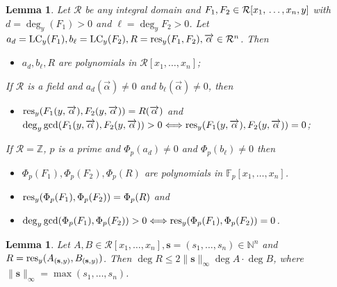 \documentclass[final,20pt]{elsarticle}
\newtheorem{lemma}[theorem]{Lemma}
\def\N{{\mathbb N}}
\def\Z{{\mathbb Z}}
\def\F{{\mathbb{F}}}
\def\res{\hbox{\rm{res}}}
\def\LC{\hbox{\rm{LC}}}
\begin{document}
\begin{lemma}\cite[Lemma 4]{hu2021fast}\label{lm-2}
Let $\mathcal{R}$ be any integral domain and $F_1,F_2\in\mathcal{R}[x_1,\\ \dots,x_n,y]$ with $d=\deg_y(F_1)>0$ and $\ell=\deg_yF_2>0$. Let $a_d=\LC_y(F_1),b_{\ell}=\LC_y(F_2),R=\res_{y}(F_1,F_2),\overrightarrow{\alpha}\in \mathcal{R}^n$. Then
%
\begin{itemize}
\item[(\lowercase\expandafter{\romannumeral1})]   $a_d,b_{\ell},R$ are polynomials in $\mathcal{R}[x_1,\dots,x_n]$;
\end{itemize}
If $\mathcal{R}$ is a field and $a_d(\overrightarrow{\alpha})\neq 0$ and $b_{\ell}(\overrightarrow{\alpha})\neq 0$, then
\begin{itemize}
\item[(\lowercase\expandafter{\romannumeral2})]
    $\res_{y}(F_1(y,\overrightarrow{\alpha}),F_2(y, \overrightarrow{\alpha}))=R(\overrightarrow{\alpha})$ and  $\deg_{y}\gcd(F_1(y,\overrightarrow{\alpha}),F_2(y,\overrightarrow{\alpha}))>0\Longleftrightarrow \res_{y}(F_1(y,\overrightarrow{\alpha}),F_2(y,\overrightarrow{\alpha}))=0$;
\end{itemize}
If $\mathcal{R}=\Z$, $p$ is a prime and $\Phi_p(a_d)\neq 0$ and $\Phi_p(b_{\ell})\neq 0$ then
\begin{itemize}
\item[(\lowercase\expandafter{\romannumeral3})]$\Phi_p(F_1),\Phi_p(F_2),\Phi_p(R)$ are polynomials in $\F_p[x_1,\dots,x_n]$.
    \item[(\lowercase\expandafter{\romannumeral4})]$\res_y(\Phi_p(F_1),\Phi_p(F_2))=\Phi_p(R)$ and
\item[(\lowercase\expandafter{\romannumeral5})] $\deg_y\gcd(\Phi_p(F_1),\Phi_p(F_2))>0\Longleftrightarrow \res_y(\Phi_p(F_1),\Phi_p(F_2))=0$.
\end{itemize}
\end{lemma}

\begin{lemma}\label{the-14}
Let $A,B\in \mathcal{R}[x_1,\dots,x_n],\mathbf{s}=(s_1,\dots,s_n)\in\N^n$ and $R=\res_y(A_{(\mathbf{s},y)},\\ B_{(\mathbf{s},y)})$. Then $\deg R\leq 2\|\mathbf{s}\|_{\infty}\deg A\cdot\deg B$, where $\|\mathbf{s}\|_{\infty}=\max(s_1,\dots,s_n)$.
\end{lemma}
\end{document}
